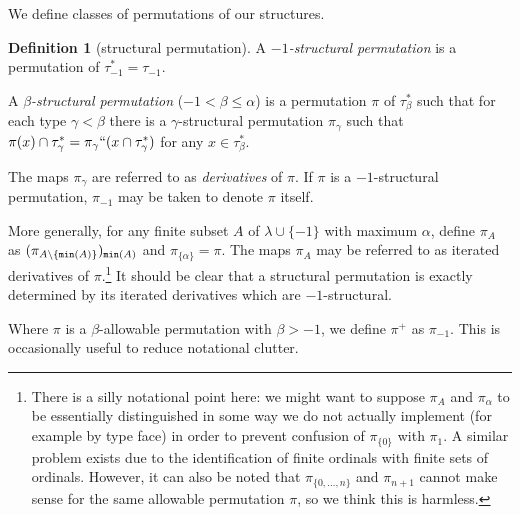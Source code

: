 \documentclass[112pt]{article}
\theoremstyle{definition}
\newtheorem{definition}[theorem]{Definition}
\theoremstyle{remark}
\newcommand{\rk}[1]{{\color{blue}\sl #1}}
\newcommand{\hsuggest}[1]{{\color{magenta}#1}}
\begin{document}
We define classes of permutations of our structures.
\begin{definition}[structural permutation]\label{def:structural_permutation}
A {\em $-1$-structural permutation\/} is a permutation of $\tau_{-1}^* = \tau_{-1}$.

A {\em $\beta$-structural permutation\/} ($-1 < \beta \leq \alpha$) is a permutation $\pi$ of $\tau_\beta^*$ such that for each type $\gamma<\beta$ there is a $\gamma$-structural permutation
$\pi_\gamma$ such that $\pi(x) \cap \tau^*_\gamma = \pi_\gamma``(x \cap \tau^*_\gamma)$ for any $x \in \tau^*_\beta$.

The maps $\pi_\gamma$ are referred to as {\em derivatives\/} of $\pi$.  {If $\pi$ is a $-1$-structural permutation, $\pi_{-1}$ may be taken to denote $\pi$ itself.}

More generally, for any finite subset $A$ of $\lambda \cup \{-1\}$ with maximum $\alpha$,
define $\pi_A$ as $(\pi_{A \setminus \{{\tt min}(A)\}})_{{\tt min}(A)}$ {and $\pi_{\{\alpha\}} = \pi$}.  The maps $\pi_A$ may be referred to as iterated derivatives of $\pi$.\footnote{There is a silly notational point here:  we might want to suppose $\pi_A$ and $\pi_\alpha$ to be essentially distinguished in some way we do not actually implement (for example by type face) in order to prevent confusion of $\pi_{\{0\}}$ with $\pi_1$.  A similar problem exists due to the identification of finite ordinals with finite sets of ordinals.  However, it can also be noted that $\pi_{\{0,\ldots,n\}}$ and $\pi_{n+1}$ cannot make sense for the same allowable permutation $\pi$, so we think this is harmless.}  It should be clear that a structural permutation is exactly determined by its iterated derivatives which are $-1$-structural.

Where $\pi$ is a $\beta$-allowable permutation with $\beta>-1$, we define $\pi^+$ as $\pi_{-1}$.  This is occasionally useful to reduce notational clutter.
\end{definition}

\begin{comment}
 \marginpar{\hsuggest{At first I thought this notation would be omitted, but in fact it remains useful.   It may now be OMITTABLE, revisit this.  It is still used with ordinal subscripts and I added the definition.}} We introduce the brief notation $\pi^+_A(x) = \pi_{A \cup \{-1\}}(x)$ where $x \in \tau_{-1}$ and $-1 \not\in A$ [in fact, $\pi^+_A = (\pi_A)_{-1}$, but we find the short notation useful, though it is less often used than in earlier versions] and also $\pi_\delta^+ = (\pi_\delta)_{-1}$ for $\delta\in \lambda$.
\end{comment}
\end{document}
